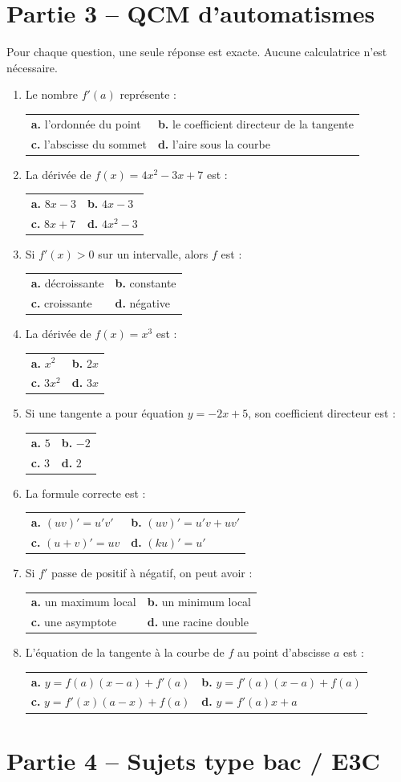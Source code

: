 \documentclass[11pt,a4paper]{article}
\makeatletter
\newcounter{question}
\newcommand{\qcm}[4]{%
\begin{center}
\begin{tabularx}{0.96\linewidth}{@{}XX@{}}
\textbf{a.} #1 & \textbf{b.} #2\\[1mm]
\textbf{c.} #3 & \textbf{d.} #4
\end{tabularx}
\end{center}}
\makeatother
\begin{document}
\section*{Partie 3 -- QCM d'automatismes}
Pour chaque question, une seule réponse est exacte. Aucune calculatrice n'est nécessaire.
\begin{enumerate}
\item Le nombre $f'(a)$ représente :
\qcm{l'ordonnée du point}{le coefficient directeur de la tangente}{l'abscisse du sommet}{l'aire sous la courbe}
\item La dérivée de $f(x)=4x^2-3x+7$ est :
\qcm{$8x-3$}{$4x-3$}{$8x+7$}{$4x^2-3$}
\item Si $f'(x)>0$ sur un intervalle, alors $f$ est :
\qcm{décroissante}{constante}{croissante}{négative}
\item La dérivée de $f(x)=x^3$ est :
\qcm{$x^2$}{$2x$}{$3x^2$}{$3x$}
\item Si une tangente a pour équation $y=-2x+5$, son coefficient directeur est :
\qcm{$5$}{$-2$}{$3$}{$2$}
\item La formule correcte est :
\qcm{$(uv)'=u'v'$}{$(uv)'=u'v+uv'$}{$(u+v)'=uv$}{$(ku)'=u'$}
\item Si $f'$ passe de positif à négatif, on peut avoir :
\qcm{un maximum local}{un minimum local}{une asymptote}{une racine double}
\item L'équation de la tangente à la courbe de $f$ au point d'abscisse $a$ est :
\qcm{$y=f(a)(x-a)+f'(a)$}{$y=f'(a)(x-a)+f(a)$}{$y=f'(x)(a-x)+f(a)$}{$y=f'(a)x+a$}
\end{enumerate}
\clearpage


\section*{Partie 4 -- Sujets type bac / E3C}
\end{document}
